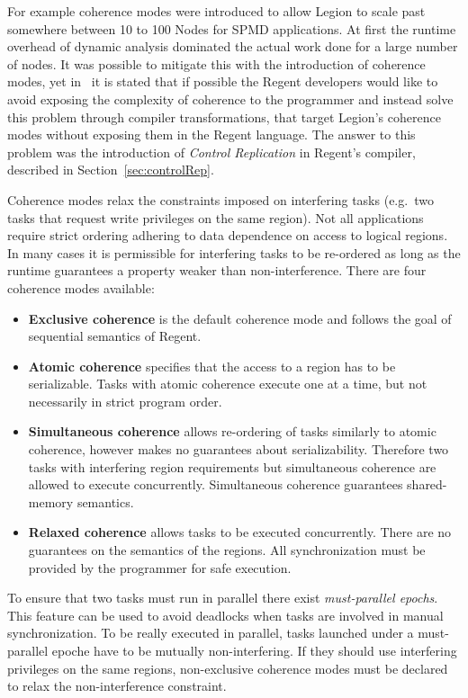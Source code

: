 \documentclass{article}      %
\begin{document}
For example coherence modes were introduced to allow Legion to scale past somewhere between 10 to 100 Nodes for SPMD applications. At first the runtime overhead of dynamic analysis dominated the actual work done for a large number of nodes. It was possible to mitigate this with the introduction of coherence modes, yet in~\cite{regentPaper} it is stated that if possible the Regent developers would like to avoid exposing the complexity of coherence to the programmer and instead solve this problem through compiler transformations, that target Legion's coherence modes without exposing them in the Regent language. The answer to this problem was the introduction of \emph{Control Replication} in Regent's compiler, described in Section~\ref{sec:controlRep}.

Coherence modes relax the constraints imposed on interfering tasks (e.g.\ two tasks that request write privileges on the same region). Not all applications
require strict ordering adhering to data dependence on access to logical regions. In many cases it is permissible for interfering tasks to be re-ordered
as long as the runtime guarantees a property weaker than non-interference. There are four coherence modes available:
\begin{itemize}
	\item \textbf{Exclusive coherence} is the default coherence mode and follows the goal of sequential semantics of Regent.
	\item \textbf{Atomic coherence} specifies that the access to a region has to be serializable. Tasks with atomic coherence execute one at a time, but not necessarily in strict program order. 
	\item \textbf{Simultaneous coherence} allows re-ordering of tasks similarly to atomic coherence, however makes no guarantees about serializability. Therefore two tasks with interfering region requirements but simultaneous coherence are allowed to execute concurrently. Simultaneous coherence guarantees shared-memory semantics.
	\item \textbf{Relaxed coherence} allows tasks to be executed concurrently. There are no guarantees on the semantics of the regions. All synchronization must be provided by the programmer for safe execution.
\end{itemize}

To ensure that two tasks must run in parallel there exist \emph{must-parallel epochs}. This feature can be used to avoid deadlocks when tasks are involved in manual synchronization. To be really executed in parallel, tasks launched under a must-parallel epoche have to be mutually non-interfering. If they should use interfering privileges on the same regions, non-exclusive coherence modes must be declared to relax the non-interference constraint.
\end{document}
